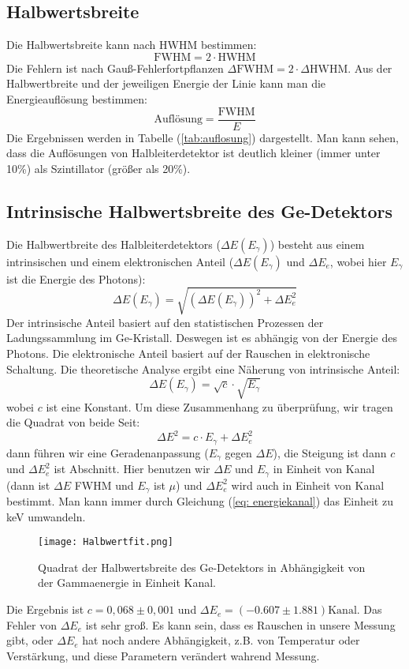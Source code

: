 \documentclass[ngerman,11pt]{article}
\begin{document}
\begin{multicols}{2}
	\subsection{Halbwertsbreite}
	Die Halbwertsbreite kann nach HWHM bestimmen:
	$$ \mathrm{FWHM} = 2\cdot\mathrm{HWHM} $$
	Die Fehlern ist nach Gau\ss-Fehlerfortpflanzen $\Delta\mathrm{FWHM} = 2\cdot\Delta\mathrm{HWHM}$. Aus der Halbwertbreite und der jeweiligen Energie der Linie kann man die Energieaufl\"osung bestimmen:
	$$ \text{Aufl\"osung}=\frac{\mathrm{FWHM}}{E} $$ Die Ergebnissen werden in Tabelle (\ref{tab:auflosung}) dargestellt. Man kann sehen, dass die Aufl\"osungen von Halbleiterdetektor ist deutlich kleiner (immer unter 10\%) als Szintillator (gr\"o\ss er als 20\%).
	\subsection{Intrinsische Halbwertsbreite des Ge-Detektors}
	 Die Halbwertbreite des Halbleiterdetektors ($\Delta E(E_\gamma)$) besteht aus einem intrinsischen und einem elektronischen Anteil ($\Delta E(E_\gamma)$ und $\Delta E_e$, wobei hier $E_\gamma$ ist die Energie des Photons):
	 $$
	 \Delta E(E_\gamma) = \sqrt{ (\Delta E(E_\gamma))^2 + \Delta E_e^2 }
	 $$
	 Der intrinsische Anteil basiert auf den statistischen Prozessen der Ladungssammlung im Ge-Kristall. Deswegen ist es abh\"angig von der Energie des Photons. Die elektronische Anteil basiert auf der Rauschen in elektronische Schaltung. Die theoretische Analyse ergibt eine N\"aherung von intrinsische Anteil:
	 $$ \Delta E(E_\gamma) = \sqrt{c}\cdot\sqrt{E_\gamma} $$
	 wobei $c$ ist eine Konstant.
	 Um diese Zusammenhang zu \"uberpr\"ufung, wir tragen die Quadrat von beide Seit:
	 $$ \Delta E^2 = c\cdot E_\gamma + \Delta E_e^2 $$
	 dann f\"uhren wir eine Geradenanpassung ($E_\gamma$ gegen $\Delta E$), die Steigung ist dann $c$ und $\Delta E_e^2$ ist Abschnitt. Hier benutzen wir  $\Delta E$ und $E_\gamma$ in Einheit von Kanal (dann ist $\Delta E$ FWHM und $E_\gamma$ ist $\mu$) und $\Delta E_e^2$ wird auch in Einheit von Kanal bestimmt. Man kann immer durch Gleichung (\ref{eq: energiekanal}) das Einheit zu keV umwandeln. 
	 \begin{figure}[H]
	 	\centering
	 	\texttt{[image: Halbwertfit.png]}
	 	\caption{Quadrat der Halbwertsbreite des Ge-Detektors in Abh\"angigkeit von der Gammaenergie in Einheit Kanal.}
	 	\label{fig:halbwertfit}
	 \end{figure}
 	 Die Ergebnis ist $c = 0,068\pm0,001$ und $\Delta E_e = (-0.607\pm1.881)\mathrm{Kanal}$. Das Fehler von $\Delta E_e$ ist sehr gro\ss. Es kann sein, dass es Rauschen in unsere Messung gibt, oder $\Delta E_e$ hat noch andere Abh\"angigkeit, z.B. von Temperatur oder Verst\"arkung, und diese Parametern ver\"andert wahrend Messung.

\end{multicols}
\end{document}
